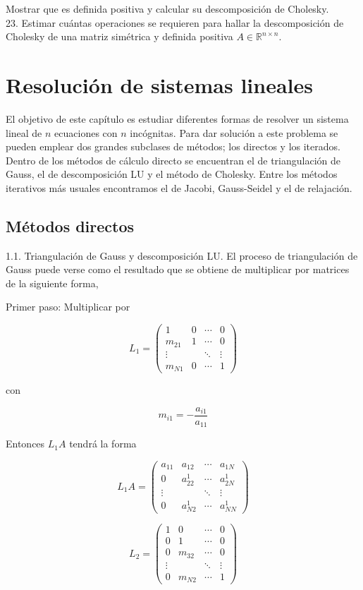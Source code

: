 \documentclass[10pt]{book}
\begin{document}
Mostrar que es definida positiva y calcular su descomposición de Cholesky.\\
23. Estimar cuántas operaciones se requieren para hallar la descomposición de Cholesky de una matriz simétrica y definida positiva $A \in \mathbb{R}^{n \times n}$.

\chapter{Resolución de sistemas lineales}
El objetivo de este capítulo es estudiar diferentes formas de resolver un sistema lineal de $n$ ecuaciones con $n$ incógnitas. Para dar solución a este problema se pueden emplear dos grandes subclases de métodos; los directos y los iterados. Dentro de los métodos de cálculo directo se encuentran el de triangulación de Gauss, el de descomposición LU y el método de Cholesky. Entre los métodos iterativos más usuales encontramos el de Jacobi, Gauss-Seidel y el de relajación.

\section{Métodos directos}
1.1. Triangulación de Gauss y descomposición LU. El proceso de triangulación de Gauss puede verse como el resultado que se obtiene de multiplicar por matrices de la siguiente forma,

Primer paso: Multiplicar por

$$
L_{1}=\left(\begin{array}{cccc}
1 & 0 & \cdots & 0 \\
m_{21} & 1 & \cdots & 0 \\
\vdots & & \ddots & \vdots \\
m_{N 1} & 0 & \cdots & 1
\end{array}\right)
$$

con

$$
m_{i 1}=-\frac{a_{i 1}}{a_{11}}
$$

Entonces $L_{1} A$ tendrá la forma

$$
L_{1} A=\left(\begin{array}{cccc}
a_{11} & a_{12} & \cdots & a_{1 N} \\
0 & a_{22}^{1} & \cdots & a_{2 N}^{1} \\
\vdots & & \ddots & \vdots \\
0 & a_{N 2}^{1} & \cdots & a_{N N}^{1}
\end{array}\right)
$$

$$
L_{2}=\left(\begin{array}{cccc}
1 & 0 & \cdots & 0 \\
0 & 1 & \cdots & 0 \\
0 & m_{32} & \cdots & 0 \\
\vdots & & \ddots & \vdots \\
0 & m_{N 2} & \cdots & 1
\end{array}\right)
$$
\end{document}
